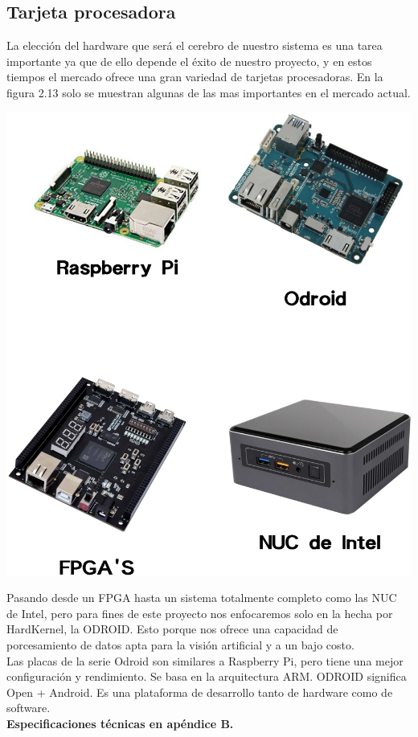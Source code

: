 \subsection{Tarjeta procesadora}
La elección del hardware que será el cerebro de nuestro sistema es una tarea importante ya que de ello depende el éxito de
nuestro proyecto, y en estos tiempos el mercado ofrece una gran variedad de tarjetas procesadoras. En la figura 2.13 solo se muestran algunas de las mas importantes en el 
mercado actual.
\begin{center}
	\includegraphics[width=0.60 \textwidth]{Contenido/Cuerpo/Capitulo2/Fig7.eps}
	\label{fig:MarcoTeorico:Fig12}
\end{center}
Pasando desde un FPGA hasta un sistema totalmente completo como las NUC de Intel, pero para fines de este proyecto nos enfocaremos
solo en la hecha por HardKernel, la ODROID. Esto porque nos ofrece una capacidad de porcesamiento de datos apta para la visión
artificial y a un bajo costo.\\
Las placas de la serie Odroid son similares a Raspberry Pi, pero tiene una mejor
configuración y rendimiento. Se basa en la arquitectura ARM. \cite{Book:Lentin2018}
ODROID significa Open + Android. Es una plataforma de desarrollo tanto de
hardware como de software.\\
\textbf{Especificaciones técnicas en apéndice B.} \\
